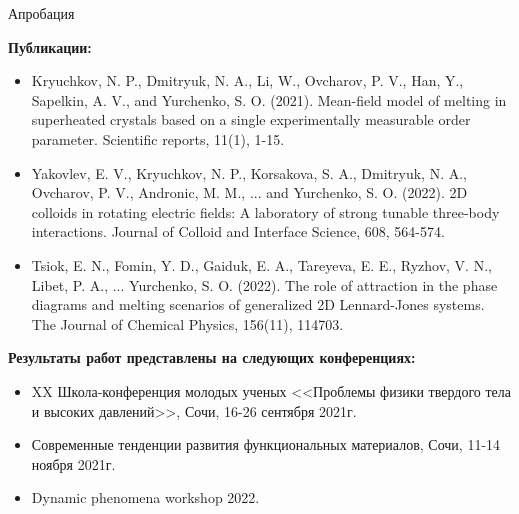 \documentclass{beamer} %
\begin{document}
\begin{frame}{Апробация}
  \footnotesize{

    \textbf{Публикации:}

    \begin{itemize}
    \item Kryuchkov, N. P., Dmitryuk, N. A., Li, W., Ovcharov, P. V., Han, Y., Sapelkin, A. V., and Yurchenko, S. O. (2021). Mean-field model of melting in superheated crystals based on a single experimentally measurable order parameter. Scientific reports, 11(1), 1-15.
    \item Yakovlev, E. V., Kryuchkov, N. P., Korsakova, S. A., Dmitryuk, N. A., Ovcharov, P. V., Andronic, M. M., ... and Yurchenko, S. O. (2022). 2D colloids in rotating electric fields: A laboratory of strong tunable three-body interactions. Journal of Colloid and Interface Science, 608, 564-574.
    \item Tsiok, E. N., Fomin, Y. D., Gaiduk, E. A., Tareyeva, E. E., Ryzhov, V. N., Libet, P. A., ... Yurchenko, S. O. (2022). The role of attraction in the phase diagrams and melting scenarios of generalized 2D Lennard-Jones systems. The Journal of Chemical Physics, 156(11), 114703.
    \end{itemize}

    \textbf {Результаты работ представлены на следующих конференциях:}

    \begin{itemize}
    \item XX Школа-конференция молодых ученых <<Проблемы физики твердого тела и высоких давлений>>, Сочи, 16-26 сентября 2021г.
    \item Современные тенденции развития функциональных материалов, Сочи, 11-14 ноября 2021г.
    \item Dynamic phenomena workshop 2022.
    \end{itemize}
  }
\end{frame}
\end{document}
